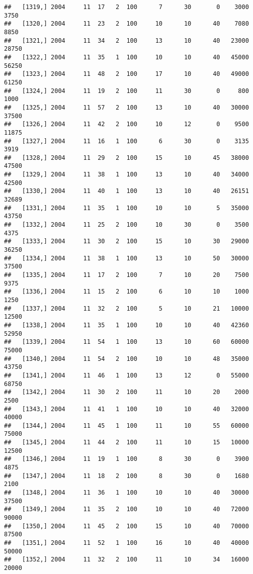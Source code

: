 \documentclass{article}\usepackage[]{graphicx}\usepackage[]{color}
\makeatletter
\newenvironment{kframe}{%
 \def\at@end@of@kframe{}%
 \ifinner\ifhmode%
  \def\at@end@of@kframe{\end{minipage}}%
  \begin{minipage}{\columnwidth}%
 \fi\fi%
 \def\FrameCommand##1{\hskip\@totalleftmargin \hskip-\fboxsep
 \colorbox{shadecolor}{##1}\hskip-\fboxsep
     \hskip-\linewidth \hskip-\@totalleftmargin \hskip\columnwidth}%
 \MakeFramed {\advance\hsize-\width
   \@totalleftmargin\z@ \linewidth\hsize
   \@setminipage}}%
 {\par\unskip\endMakeFramed%
 \at@end@of@kframe}
\newenvironment{knitrout}{}{} %
\makeatother
\begin{document}
\begin{knitrout}
\begin{kframe}
\begin{verbatim}
##   [1319,] 2004     11  17   2  100      7      30       0    3000    3750
##   [1320,] 2004     11  23   2  100     10      10      40    7080    8850
##   [1321,] 2004     11  34   2  100     13      10      40   23000   28750
##   [1322,] 2004     11  35   1  100     10      10      40   45000   56250
##   [1323,] 2004     11  48   2  100     17      10      40   49000   61250
##   [1324,] 2004     11  19   2  100     11      30       0     800    1000
##   [1325,] 2004     11  57   2  100     13      10      40   30000   37500
##   [1326,] 2004     11  42   2  100     10      12       0    9500   11875
##   [1327,] 2004     11  16   1  100      6      30       0    3135    3919
##   [1328,] 2004     11  29   2  100     15      10      45   38000   47500
##   [1329,] 2004     11  38   1  100     13      10      40   34000   42500
##   [1330,] 2004     11  40   1  100     13      10      40   26151   32689
##   [1331,] 2004     11  35   1  100     10      10       5   35000   43750
##   [1332,] 2004     11  25   2  100     10      30       0    3500    4375
##   [1333,] 2004     11  30   2  100     15      10      30   29000   36250
##   [1334,] 2004     11  38   1  100     13      10      50   30000   37500
##   [1335,] 2004     11  17   2  100      7      10      20    7500    9375
##   [1336,] 2004     11  15   2  100      6      10      10    1000    1250
##   [1337,] 2004     11  32   2  100      5      10      21   10000   12500
##   [1338,] 2004     11  35   1  100     10      10      40   42360   52950
##   [1339,] 2004     11  54   1  100     13      10      60   60000   75000
##   [1340,] 2004     11  54   2  100     10      10      48   35000   43750
##   [1341,] 2004     11  46   1  100     13      12       0   55000   68750
##   [1342,] 2004     11  30   2  100     11      10      20    2000    2500
##   [1343,] 2004     11  41   1  100     10      10      40   32000   40000
##   [1344,] 2004     11  45   1  100     11      10      55   60000   75000
##   [1345,] 2004     11  44   2  100     11      10      15   10000   12500
##   [1346,] 2004     11  19   1  100      8      30       0    3900    4875
##   [1347,] 2004     11  18   2  100      8      30       0    1680    2100
##   [1348,] 2004     11  36   1  100     10      10      40   30000   37500
##   [1349,] 2004     11  35   2  100     10      10      40   72000   90000
##   [1350,] 2004     11  45   2  100     15      10      40   70000   87500
##   [1351,] 2004     11  52   1  100     16      10      40   40000   50000
##   [1352,] 2004     11  32   2  100     11      10      34   16000   20000

\end{verbatim}
\end{kframe}
\end{knitrout}
\end{document}
